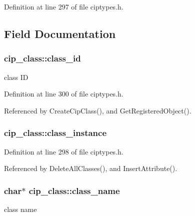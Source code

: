 \-Definition at line 297 of file ciptypes.\-h.



\subsection{\-Field \-Documentation}
\hypertarget{structcip__class_abd6eb84c5d2f1e74c2660bb5ebf6c64e}{
\subsubsection[{class\-\_\-id}]{ {\bf cip\-\_\-class\-::class\-\_\-id}}}\label{da/d8e/structcip__class_abd6eb84c5d2f1e74c2660bb5ebf6c64e}
class \-I\-D 

\-Definition at line 300 of file ciptypes.\-h.



\-Referenced by \-Create\-Cip\-Class(), and \-Get\-Registered\-Object().

\hypertarget{structcip__class_ab9ed12190a1a0eb8de324736094f3d5a}{
\subsubsection[{class\-\_\-instance}]{ {\bf cip\-\_\-class\-::class\-\_\-instance}}}\label{da/d8e/structcip__class_ab9ed12190a1a0eb8de324736094f3d5a}


\-Definition at line 298 of file ciptypes.\-h.



\-Referenced by \-Delete\-All\-Classes(), and \-Insert\-Attribute().

\hypertarget{structcip__class_a298e05ca692371f03674cbd5e3ba194c}{
\subsubsection[{class\-\_\-name}]{\setlength{\rightskip}{0pt plus 5cm}char$\ast$ {\bf cip\-\_\-class\-::class\-\_\-name}}}\label{da/d8e/structcip__class_a298e05ca692371f03674cbd5e3ba194c}
class name 

